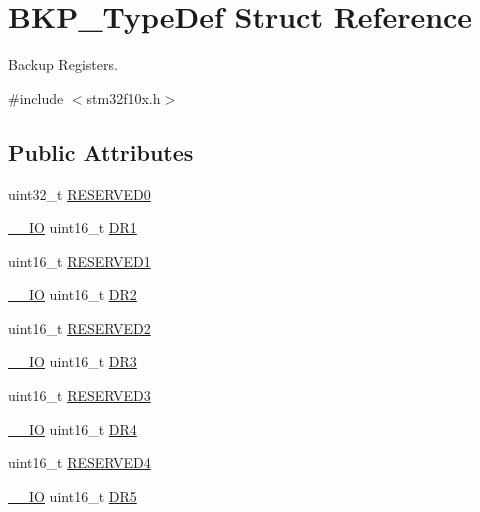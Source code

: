 \hypertarget{struct_b_k_p___type_def}{}\section{B\+K\+P\+\_\+\+Type\+Def Struct Reference}
\label{struct_b_k_p___type_def}


Backup Registers.  




{\ttfamily \#include $<$stm32f10x.\+h$>$}

\subsection*{Public Attributes}
\begin{DoxyCompactItemize}
\item 
uint32\+\_\+t \hyperlink{struct_b_k_p___type_def_a8b41b52d05011ff2ed2b85977ea20413}{R\+E\+S\+E\+R\+V\+E\+D0}
\item 
\hyperlink{core__sc300_8h_aec43007d9998a0a0e01faede4133d6be}{\+\_\+\+\_\+\+IO} uint16\+\_\+t \hyperlink{struct_b_k_p___type_def_aaa1a907c0aaf85c6de3aa3d829a07a3a}{D\+R1}
\item 
uint16\+\_\+t \hyperlink{struct_b_k_p___type_def_a0d818c25d71abdfc33e9d3d905a0f5f2}{R\+E\+S\+E\+R\+V\+E\+D1}
\item 
\hyperlink{core__sc300_8h_aec43007d9998a0a0e01faede4133d6be}{\+\_\+\+\_\+\+IO} uint16\+\_\+t \hyperlink{struct_b_k_p___type_def_a98d088136a3ba92025a8381d9a19f7b0}{D\+R2}
\item 
uint16\+\_\+t \hyperlink{struct_b_k_p___type_def_ae9cc232260bb14cfbdb0ecee85b2be50}{R\+E\+S\+E\+R\+V\+E\+D2}
\item 
\hyperlink{core__sc300_8h_aec43007d9998a0a0e01faede4133d6be}{\+\_\+\+\_\+\+IO} uint16\+\_\+t \hyperlink{struct_b_k_p___type_def_a034cf532a9752513de879c0f4ff38d0a}{D\+R3}
\item 
uint16\+\_\+t \hyperlink{struct_b_k_p___type_def_a3a3f66ad2e85c6d29e9d282cf19d193e}{R\+E\+S\+E\+R\+V\+E\+D3}
\item 
\hyperlink{core__sc300_8h_aec43007d9998a0a0e01faede4133d6be}{\+\_\+\+\_\+\+IO} uint16\+\_\+t \hyperlink{struct_b_k_p___type_def_a02abe76a58a7f018ea450221c955ab30}{D\+R4}
\item 
uint16\+\_\+t \hyperlink{struct_b_k_p___type_def_a1a74789e3a88f3bddf2e83673c5a6e2b}{R\+E\+S\+E\+R\+V\+E\+D4}
\item 
\hyperlink{core__sc300_8h_aec43007d9998a0a0e01faede4133d6be}{\+\_\+\+\_\+\+IO} uint16\+\_\+t \hyperlink{struct_b_k_p___type_def_a35b107064600b60af1c42a5e5a6a16c1}{D\+R5}

\end{DoxyCompactItemize}

